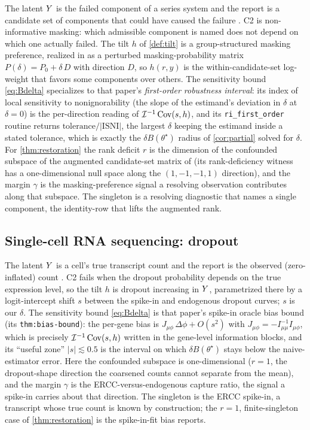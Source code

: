 The latent $Y$ is the failed component of a series system and the report is a
candidate set of components that could have caused the failure
\citep{towell2026masked}. C2 is non-informative masking: which admissible component
is named does not depend on which one actually failed. The tilt $h$ of
\cref{def:tilt} is a group-structured masking preference, realized in
\citet{towell2026mdrelax} as a perturbed masking-probability matrix $P(\delta) = P_0
+ \delta\, D$ with direction $D$, so $h(r,y)$ is the within-candidate-set log-weight
that favors some components over others. The sensitivity bound \eqref{eq:Bdelta}
specializes to that paper's \emph{first-order robustness interval}: its index of
local sensitivity to nonignorability (the slope of the estimand's deviation in
$\delta$ at $\delta = 0$) is the per-direction reading of $\mathcal{I}^{-1}\operatorname{Cov}(s,h)$, and
its \texttt{ri\_first\_order} routine returns $\mathrm{tolerance}/|\mathrm{ISNI}|$,
the largest $\delta$ keeping the estimand inside a stated tolerance, which is exactly
the $\delta B(\theta^\star)$ radius of \cref{cor:partial} solved for $\delta$. For
\cref{thm:restoration} the rank deficit $r$ is the dimension of the confounded
subspace of the augmented candidate-set matrix of \citet{towell2026masked} (its
rank-deficiency witness has a one-dimensional null space along the
$(1,-1,-1,1)$ direction), and the margin $\gamma$ is the masking-preference signal a
resolving observation contributes along that subspace. The singleton is a resolving
diagnostic that names a single component, the identity-row that lifts the augmented
rank.

\subsection{Single-cell RNA sequencing: dropout}
\label{sec:inst-scrna}

The latent $Y$ is a cell's true transcript count and the report is the observed
(zero-inflated) count \citep{towell2026scrnacoarsening}. C2 fails when the dropout
probability depends on the true expression level, so the tilt $h$ is dropout
increasing in $Y$, parametrized there by a logit-intercept shift $s$ between the
spike-in and endogenous dropout curves; $s$ is our $\delta$. The sensitivity bound
\eqref{eq:Bdelta} is that paper's spike-in oracle bias bound (its
\texttt{thm:bias-bound}): the per-gene bias is $J_{\mu\phi}\,\Delta\phi + O(s^2)$
with $J_{\mu\phi} = -I_{\mu\mu}^{-1} I_{\mu\phi}$, which is precisely
$\mathcal{I}^{-1}\operatorname{Cov}(s,h)$ written in the gene-level information blocks, and its
``useful zone'' $|s| \lesssim 0.5$ is the interval on which $\delta B(\theta^\star)$
stays below the naive-estimator error. Here the confounded subspace is
one-dimensional ($r = 1$, the dropout-shape direction the coarsened counts cannot
separate from the mean), and the margin $\gamma$ is the ERCC-versus-endogenous
capture ratio, the signal a spike-in carries about that direction. The singleton is
the ERCC spike-in, a transcript whose true count is known by construction; the
$r = 1$, finite-singleton case of \cref{thm:restoration} is the spike-in-fit bias
\citet{towell2026scrnacoarsening} reports.

